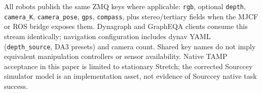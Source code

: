 All robots publish the same ZMQ keys where applicable: \texttt{rgb}, optional \texttt{depth}, \texttt{camera\_K}, \texttt{camera\_pose}, \texttt{gps}, \texttt{compass}, plus stereo/tertiary fields when the MJCF or ROS bridge exposes them.
Dynagraph and GraphEQA clients consume this stream identically; navigation configuration includes dynav YAML (\texttt{depth\_source}, DA3 presets) and camera count. Shared key names do not imply equivalent manipulation controllers or sensor availability. Native TAMP acceptance in this paper is limited to stationary Stretch; the corrected Sourccey simulator model is an implementation asset, not evidence of Sourccey native task success.

